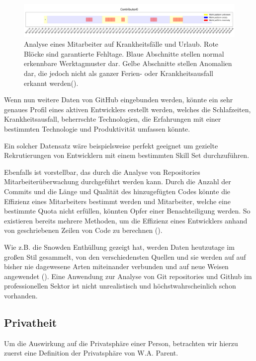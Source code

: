 \documentclass[12pt,a4paper]{article}
\begin{document}
\begin{figure}[H]
    \includegraphics[scale=0.17]{./gfx/krankheit.png}
    \centering
    \caption{Analyse eines Mitarbeiter auf Krankheitsfälle und Urlaub.
    Rote Blöcke sind garantierte Fehltage.
    Blaue Abschnitte stellen normal erkennbare Werktagmuster dar.
    Gelbe Abschnitte stellen Anomalien dar, die jedoch nicht als ganzer Ferien- oder Krankheitsausfall erkannt werden(\cite[p.~37-39]{thes:thesis}).}\label{fig:git-history}
\end{figure}


Wenn nun weitere Daten von GitHub eingebunden werden, könnte ein sehr genaues Profil eines aktiven Entwicklers erstellt werden, welches die Schlafzeiten, Krankheitsausfall, beherrschte Technologien, die Erfahrungen mit einer bestimmten Technologie und Produktivität umfassen könnte.

Ein solcher Datensatz wäre beispielsweise perfekt geeignet um gezielte Rekrutierungen von Entwicklern mit einem bestimmten Skill Set durchzuführen.

Ebenfalls ist vorstellbar, das durch die Analyse von Repositories Mitarbeiterüberwachung durchgeführt werden kann.
Durch die Anzahl der Commits und die Länge und Qualität des hinzugefügten Codes könnte die Effizienz eines Mitarbeiters bestimmt werden und Mitarbeiter, welche eine bestimmte Quota nicht erfüllen, könnten Opfer einer Benachteiligung werden.
So existieren bereits mehrere Methoden, um die Effizienz eines Entwicklers anhand von geschriebenen Zeilen von Code zu berechnen (\cite{inproc:measuring-loc}).

Wie z.B. die Snowden Enthüllung gezeigt hat, werden Daten heutzutage im großen Stil gesammelt, von den verschiedensten Quellen und sie werden auf auf bisher nie dagewesene Arten miteinander verbunden und auf neue Weisen angewendet (\cite[p.~4]{article:snowden}).
Eine Anwendung zur Analyse von Git repositories und Github im professionellen Sektor ist nicht unrealistisch und höchstwahrscheinlich schon vorhanden.


\subsection{Privatheit}

Um die Auswirkung auf die Privatsphäre einer Person, betrachten wir hierzu zuerst eine Definition der Privatsphäre von W.A. Parent.
\end{document}

